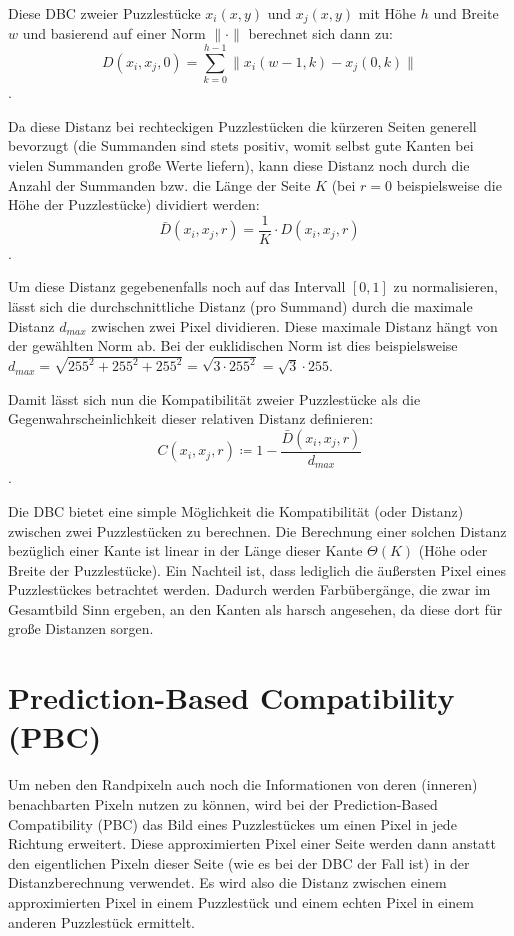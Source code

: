 \documentclass{whswinvcbook}
\begin{document}
Diese DBC zweier Puzzlestücke $x_i(x,y)$ und $x_j(x,y)$ mit Höhe $h$ und Breite $w$ und basierend auf einer Norm $\|\cdot\|$ berechnet sich dann zu: $$D(x_i,x_j,0)=\sum_{k=0}^{h-1}\|x_i(w-1,k)-x_j(0,k)\|$$.

Da diese Distanz bei rechteckigen Puzzlestücken die kürzeren Seiten generell bevorzugt (die Summanden sind stets positiv, womit selbst gute Kanten bei vielen Summanden große Werte liefern), kann diese Distanz noch durch die Anzahl der Summanden bzw. die Länge der Seite $K$ (bei $r=0$ beispielsweise die Höhe der Puzzlestücke) dividiert werden: $$\bar{D}(x_i,x_j,r)=\frac{1}{K}\cdot D(x_i,x_j,r)$$.

Um diese Distanz gegebenenfalls noch auf das Intervall $[0,1]$ zu normalisieren, lässt sich die durchschnittliche Distanz (pro Summand) durch die maximale Distanz $d_{max}$ zwischen zwei Pixel dividieren. Diese maximale Distanz hängt von der gewählten Norm ab. Bei der euklidischen Norm ist dies beispielsweise $d_{max}=\sqrt{255^2+255^2+255^2}=\sqrt{3\cdot255^2}=\sqrt{3}\cdot255$.

Damit lässt sich nun die Kompatibilität zweier Puzzlestücke als die Gegenwahrscheinlichkeit dieser relativen Distanz definieren:$$C(x_i,x_j,r)\coloneqq 1-\frac{\bar{D}(x_i,x_j,r)}{d_{max}}$$.

Die DBC bietet eine simple Möglichkeit die Kompatibilität (oder Distanz) zwischen zwei Puzzlestücken zu berechnen. Die Berechnung einer solchen Distanz bezüglich einer Kante ist linear in der Länge dieser Kante $\Theta(K)$ (Höhe oder Breite der Puzzlestücke). Ein Nachteil ist, dass lediglich die äußersten Pixel eines Puzzlestückes betrachtet werden. Dadurch werden Farbübergänge, die zwar im Gesamtbild Sinn ergeben, an den Kanten als harsch angesehen, da diese dort für große Distanzen sorgen.
\section{Prediction-Based Compatibility (PBC)}
Um neben den Randpixeln auch noch die Informationen von deren (inneren) benachbarten Pixeln nutzen zu können, wird bei der Prediction-Based Compatibility (PBC) das Bild eines Puzzlestückes um einen Pixel in jede Richtung erweitert. Diese approximierten Pixel einer Seite werden dann anstatt den eigentlichen Pixeln dieser Seite (wie es bei der DBC der Fall ist) in der Distanzberechnung verwendet. Es wird also die Distanz zwischen einem approximierten Pixel in einem Puzzlestück und einem echten Pixel in einem anderen Puzzlestück ermittelt.
\end{document}
